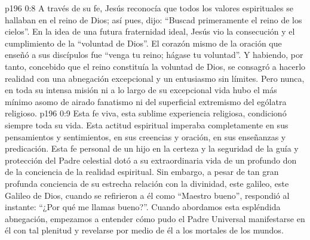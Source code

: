 \vs p196 0:8 A través de su fe, Jesús reconocía que todos los valores espirituales se hallaban en el reino de Dios; así pues, dijo: “Buscad primeramente el reino de los cielos”. En la idea de una futura fraternidad ideal, Jesús vio la consecución y el cumplimiento de la “voluntad de Dios”. El corazón mismo de la oración que enseñó a sus discípulos fue “venga tu reino; hágase tu voluntad”. Y habiendo, por tanto, concebido que el reino constituía la voluntad de Dios, se consagró a hacerlo realidad con una abnegación excepcional y un entusiasmo sin límites. Pero nunca, en toda su intensa misión ni a lo largo de su excepcional vida hubo el más mínimo asomo de airado fanatismo ni del superficial extremismo del ególatra religioso.
\vs p196 0:9 Esta fe viva, esta sublime experiencia religiosa, condicionó siempre toda su vida. Esta actitud espiritual imperaba completamente en sus pensamientos y sentimientos, en sus creencias y oración, en sus enseñanzas y predicación. Esta fe personal de un hijo en la certeza y la seguridad de la guía y protección del Padre celestial dotó a su extraordinaria vida de un profundo don de la conciencia de la realidad espiritual. Sin embargo, a pesar de tan gran profunda conciencia de su estrecha relación con la divinidad, este galileo, este Galileo de Dios, cuando se refirieron a él como “Maestro bueno”, respondió al instante: “¿Por qué me llamas bueno?”. Cuando abordamos esta espléndida abnegación, empezamos a entender cómo pudo el Padre Universal manifestarse en él con tal plenitud y revelarse por medio de él a los mortales de los mundos.

